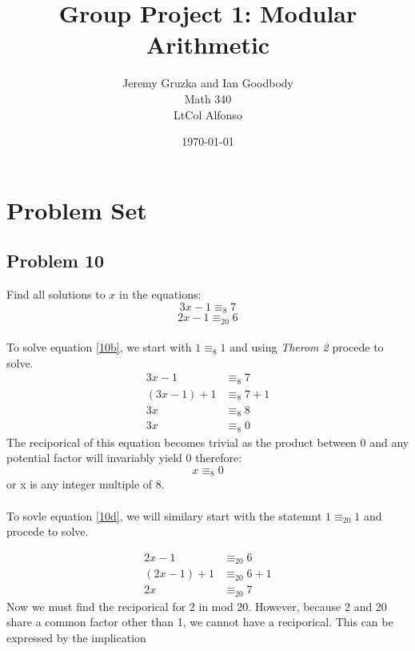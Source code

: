 \documentclass[11pt]{article}
\begin{document}
\title{Group Project 1: Modular Arithmetic}
\author{Jeremy Gruzka and Ian Goodbody \\
	Math 340 \\
	LtCol Alfonso}
\date{\today}
\maketitle

\section*{Problem Set}
\subsection*{Problem 10}
Find all solutions to $x$ in the equations:
\begin{equation} \label{10b}
	3x-1 \equiv_8 7
\end{equation}
\begin{equation} \label{10d}
	2x-1 \equiv_{20} 6
\end{equation}

\paragraph*{}
To solve equation \ref{10b}, we start with $1 \equiv_8 1$ and using \textit{Therom 2} procede to solve.
\begin{align*}
	3x-1 &\equiv_8 7 \\
	(3x-1)+1 &\equiv_8 7+1 \\
	3x &\equiv_8 8 \\
	3x &\equiv_8 0 
\end{align*}
The reciporical of this equation becomes trivial as the product between 0 and any potential factor will 
invariably yield 0 therefore:
\begin{equation*} 
	x \equiv_8 0
\end{equation*}
or x is any integer multiple of 8.

\paragraph*{} 
To sovle equation \ref{10d}, we will similary start with the statemnt 
$1 \equiv_{20} 1$ and procede to solve.

\begin{align*}
	2x-1 &\equiv_{20} 6 \\
	(2x-1)+1 &\equiv_{20} 6+1 \\
	2x &\equiv_{20} 7 
\end{align*}
Now we must find the reciporical for 2 in mod 20. However, because 2 and 20 share a common factor other than 
1, we cannot have a reciporical. This can be expressed by the implication
\end{document}
